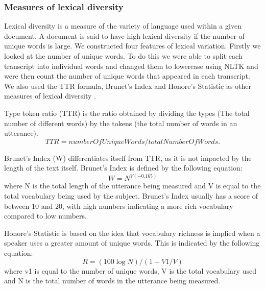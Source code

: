 \documentclass[12pt]{article}
\begin{document}
\subsubsection{Measures of lexical diversity}
Lexical diversity is a measure of the variety of language used within a given document. A document is said to have high lexical diversity if the number of unique words is large. We constructed four features of lexical variation. Firstly we looked at the number of unique words. To do this we were able to split each transcript into individual words and changed them to lowercase using NLTK and were then count the number of unique words that appeared in each transcript. We also used the TTR formula, Brunet's Index and Honore's Statistic as other measures of lexical diversity \cite{Richards1987}. 
\par 
Type token ratio (TTR) is the ratio obtained by dividing the types (The total number of different words) by the tokens (the total number of words in an utterance).
\begin{equation} \label{x1}
TTR = numberOfUniqueWords / totalNumberOfWords.
\end{equation}
\par 
Brunet's Index (W) differentiates itself from TTR, as it is not impacted by the length of the text itself. Brunet's Index is defined by the following equation:
\begin{equation} \label{x2}
W = N^{V(-0.165)}
\end{equation}
where N is the total length of the utterance being measured and V is equal to the total vocabulary being used by the subject. Brunet's Index usually has a score of between 10 and 20, with high numbers indicating a more rich vocabulary compared to low numbers. \newline
\par 
Honore's Statistic is based on the idea that vocabulary richness is implied when a speaker uses a greater amount of unique words. This is indicated by the following equation: 
\begin{equation} \label{x3}
R = (100 \log N) / (1 - V1/V)
\end{equation}
where v1 is equal to the number of unique words, V is the total vocabulary used and N is the total number of words in the utterance being measured.
\end{document}
